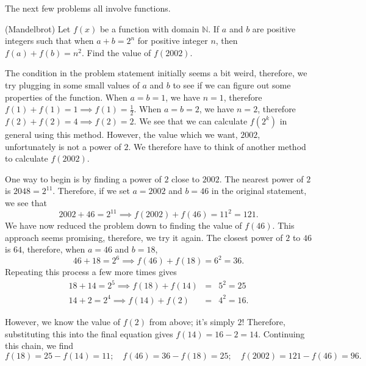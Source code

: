 \begin{comment}  

Another way to find $A_3$ and $A_4$ are by expanding:

When we cube $A_1$, we find: $$\left(x+\frac{1}{x}\right)^3=x^3+3x^2 \frac{1}{x}+3x \frac{1}{x^2}+\frac{1}{x^3}=x^3+3x+\frac{3}{x}+\frac{1}{x^3}\implies A_3=A_1^3-3A_1.$$

When we square $A_2$, we find $$\left(x^2+\frac{1}{x^2}\right)^2=x^4+2\cdot x^2\cdot \frac{1}{x^2}+\frac{1}{x^4}=x^4+2+\frac{1}{x^4}.$$
Remembering that $A_2=A_1^2-2$ from before, we now have \begin{eqnarray*}  A_4=x^4+\frac{1}{x^4}&=&\left(x^2+\frac{1}{x^2}\right)^2-2 \\ &=&\left(A_1^2-2\right)^2-2=A_1^4-4A_1^2+2. \end{eqnarray*}  \end{comment}  

The next few problems all involve functions.  

\begin{exmp}(Mandelbrot)  Let $f(x)$ be a function with domain $\mathbb{N}$.  If $a$ and $b$ are positive integers such that when $a+b=2^n$ for positive integer $n$, then $f(a)+f(b)=n^2$.  Find the value of $f(2002)$.  \end{exmp}
\begin{soln}  The condition in the problem statement initially seems a bit weird, therefore, we try plugging in some small values of $a$ and $b$ to see if we can figure out some properties of the function.  When $a=b=1$, we have $n=1$, therefore $f(1)+f(1)=1\implies f(1)=\frac12$.  When $a=b=2$, we have $n=2$, therefore $f(2)+f(2)=4\implies f(2)=2$.  We see that we can calculate $f(2^k)$ in general using this method. However, the value which we want, $2002$, unfortunately is not a power of $2$.  We therefore have to think of another method to calculate $f(2002)$.  
	
One way to begin is by finding a power of $2$ close to $2002$.  The nearest power of $2$ is $2048=2^{11}$.  Therefore, if we set $a=2002$ and $b=46$ in the original statement, we see that $$2002+46=2^{11}\implies f(2002)+f(46)=11^2=121.$$
We have now reduced the problem down to finding the value of $f(46)$.  This approach seems promising, therefore, we try it again.  The closest power of $2$ to $46$ is $64$, therefore, when $a=46$ and $b=18$,  $$46+18=2^6\implies f(46)+f(18)=6^2=36.$$
Repeating this process a few more times gives \begin{eqnarray*}  18+14=2^5\implies f(18)+f(14)&=&5^2=25 \\ 14+2=2^4\implies f(14)+f(2)&=& 4^2=16. \end{eqnarray*}

However, we know the value of $f(2)$ from above; it's simply $2$!  Therefore, substituting this into the final equation gives $f(14)=16-2=14$.  Continuing this chain, we find $$f(18)=25-f(14)=11; \quad f(46)=36-f(18)=25; \quad f(2002)=121-f(46)=\boxed{96}.$$  \end{soln}

